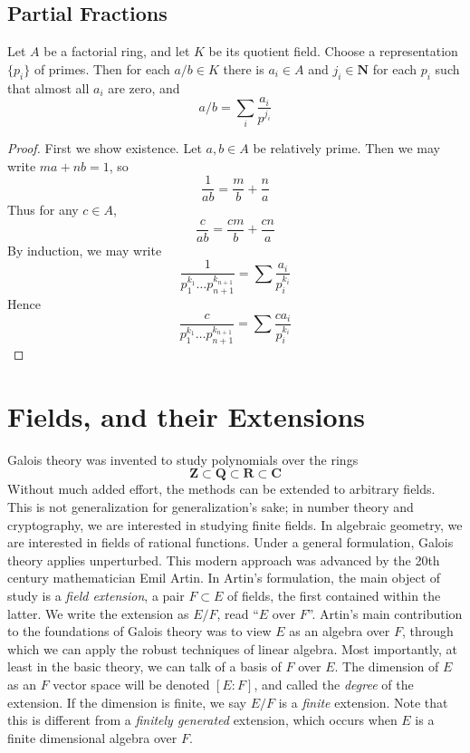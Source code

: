 \section{Partial Fractions}

\begin{theorem}
    Let $A$ be a factorial ring, and let $K$ be its quotient field. Choose a representation $\{ p_i \}$ of primes. Then for each $a/b \in K$ there is $a_i \in A$ and $j_i \in \mathbf{N}$ for each $p_i$ such that almost all $a_i$ are zero, and
    \[ a/b = \sum_i \frac{a_i}{p^{j_i}} \]
\end{theorem}
\begin{proof}
    First we show existence. Let $a,b \in A$ be relatively prime. Then we may write $ma + nb = 1$, so
    \[ \frac{1}{ab} = \frac{m}{b} + \frac{n}{a} \]
    Thus for any $c \in A$,
    \[ \frac{c}{ab} = \frac{cm}{b} + \frac{cn}{a} \]
    By induction, we may write
    \[  \frac{1}{p_1^{k_1} \dots p_{n+1}^{k_{n+1}}} = \sum \frac{a_i}{p_i^{k_i}} \]
    Hence
    \[ \frac{c}{p_1^{k_1} \dots p_{n+1}^{k_{n+1}}} = \sum \frac{c a_i}{p_i^{k_i}} \]
\end{proof}







\chapter{Fields, and their Extensions}

Galois theory was invented to study polynomials over the rings
%
\[ \mathbf{Z} \subset \mathbf{Q} \subset \mathbf{R} \subset \mathbf{C} \]
%
Without much added effort, the methods can be extended to arbitrary fields. This is not generalization for generalization's sake; in number theory and cryptography, we are interested in studying finite fields. In algebraic geometry, we are interested in fields of rational functions. Under a general formulation, Galois theory applies unperturbed. This modern approach was advanced by the 20th century mathematician Emil Artin. In Artin's formulation, the main object of study is a {\it field extension}, a pair $F \subset E$ of fields, the first contained within the latter. We write the extension as $E/F$, read ``$E$ over $F$''. Artin's main contribution to the foundations of Galois theory was to view $E$ as an algebra over $F$, through which we can apply the robust techniques of linear algebra. Most importantly, at least in the basic theory, we can talk of a basis of $F$ over $E$. The dimension of $E$ as an $F$ vector space will be denoted $[E:F]$, and called the {\it degree} of the extension. If the dimension is finite, we say $E/F$ is a {\it finite} extension. Note that this is different from a {\it finitely generated} extension, which occurs when $E$ is a finite dimensional algebra over $F$.

